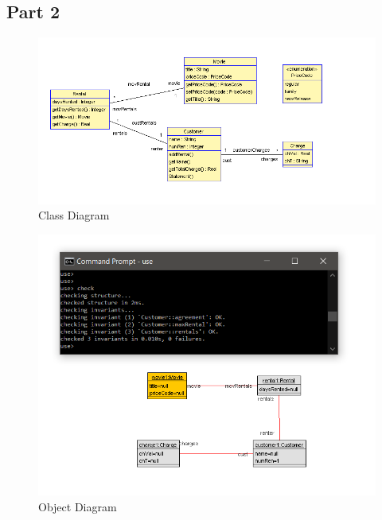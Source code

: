 \documentclass{article}
\begin{document}
\subsection*{Part 2}
\begin{figure}
	\includegraphics[width=\linewidth]{Q1Class.PNG}
	\caption{Class Diagram}
	\label{fig:class}
\end{figure}
\begin{figure}
	\includegraphics[width=\linewidth]{Q1ObjPNG.PNG}
	\caption{Object Diagram}
	\label{fig:obj}
\end{figure}
\end{document}
